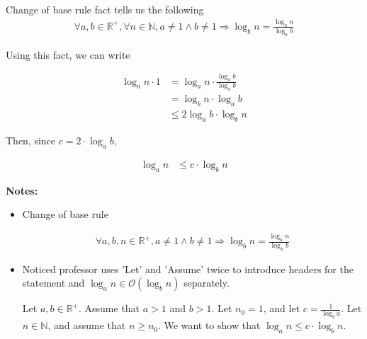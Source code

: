 \documentclass[12pt]{article}
\begin{document}
\begin{itemize}
\begin{mdframed}
        \bigskip

        \color{red}
        Change of base rule fact tells us the following
        \setcounter{equation}{0}
        \begin{align}
            \forall a,b \in \mathbb{R}^{+}, \forall n \in \mathbb{N},
            a \neq 1 \land b \neq 1 \Rightarrow \log_b n = \frac{\log_a n}{\log_a b}
        \end{align}

        Using this fact, we can write
        \color{black}

        \setcounter{equation}{0}
        \begin{align}
            \log_a n \cdot 1 &= \log_a n \cdot \frac{\log_a b}{\log_a b}\\
            &= \log_b n \cdot \log_a b\\
            &\leq 2 \log_a b \cdot \log_b n
        \end{align}

        \bigskip

        Then, since $c = 2 \cdot \log_a b$,

        \begin{align}
            \log_a n &\leq c \cdot \log_b n
        \end{align}

    \end{mdframed}

    \bigskip

    \textbf{Notes:}

    \begin{itemize}
        \item Change of base rule

        \begin{align}
            \forall a,b,n \in \mathbb{R}^{+}, a \neq 1 \land b \neq 1 \Rightarrow
            \log_b n = \frac{\log_a n}{\log_a b}
        \end{align}

        \item Noticed professor uses 'Let' and 'Assume' twice to introduce headers
        for the statement and $\log_a n \in \mathcal{O}(\log_b n)$ separately.

        \bigskip

        \begin{mdframed}
        Let $a,b \in \mathbb{R}^{+}$. Assume that $a > 1$ and $b > 1$.
        Let $n_0 = 1$, and let $c = \frac{1}{\log_b a}$. Let $n \in \mathbb{N}$,
        and assume that $n \geq n_0$. We want to show that $\log_a n \leq c \cdot \log_b n$.
        \end{mdframed}


\end{itemize}
\end{itemize}
\end{document}
